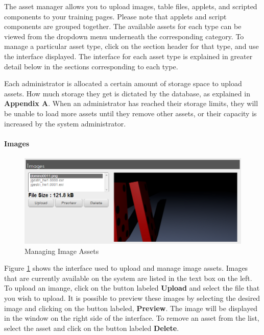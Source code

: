 \documentclass[article]{ij4uq}              %
\begin{document}
The asset manager allows you to upload images, table files, applets, and scripted components to your training pages.  Please note that applets and script components are grouped together.  The available assets for each type can be viewed from the dropdown menu underneath the corresponding category.  To manage a particular asset type, click on the section header for that type, and use the interface displayed.  The interface for each asset type is explained in greater detail below in the sections corresponding to each type.

Each administrator is allocated a certain amount of storage space to upload assets.  How much storage they get is dictated by the database, as explained in \textbf{Appendix A}.  When an administrator has reached their storage limits, they will be unable to load more assets until they remove other assets, or their capacity is increased by the system administrator.

\paragraph{Images}

\begin{figure}[h!]
 \centering
 \includegraphics[width=5.0in]{figures/manage_images.png}
 \caption{Managing Image Assets}
 \label{fig:manageImg}
\end{figure}
\FloatBarrier

Figure \ref{fig:manageImg} shows the interface used to upload and manage image assets.  Images that are currently available on the system are listed in the text box on the left. To upload an imange, click on the button labeled \textbf{Upload} and select the file that you wish to upload. It is possible to preview these images by selecting the desired image and clicking on the button labeled, \textbf{Preview}.  The image will be displayed in the window on the right side of the interface.  To remove an asset from the list, select the asset and click on the button labeled \textbf{Delete}.
\end{document}
